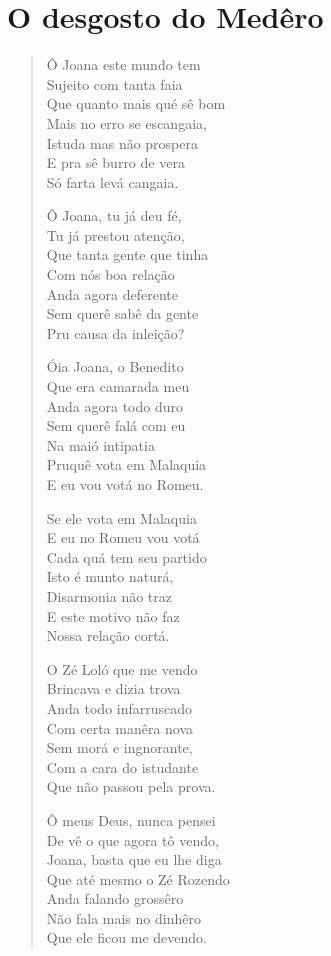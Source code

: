 \chapter{O desgosto do Medêro}

\begin{verse}
Ô Joana este mundo tem\\
Sujeito com tanta faia\\
Que quanto mais qué sê bom\\
Mais no erro se escangaia,\\
Istuda mas não prospera\\
E pra sê burro de vera\\
Só farta levá cangaia.

Ô Joana, tu já deu fé,\\
Tu já prestou atenção,\\
Que tanta gente que tinha\\
Com nós boa relação\\
Anda agora deferente\\
Sem querê sabê da gente\\
Pru causa da inleição?

Óia Joana, o Benedito\\
Que era camarada meu\\
Anda agora todo duro\\
Sem querê falá com eu\\
Na maió intipatia\\
Pruquê vota em Malaquia\\
E eu vou votá no Romeu.

Se ele vota em Malaquia\\
E eu no Romeu vou votá\\
Cada quá tem seu partido\\
Isto é munto naturá,\\
Disarmonia não traz\\
E este motivo não faz\\
Nossa relação cortá.

O Zé Loló que me vendo\\
Brincava e dizia trova\\
Anda todo infarruscado\\
Com certa manêra nova\\
Sem morá e ingnorante,\\
Com a cara do istudante\\
Que não passou pela prova.

Ô meus Deus, nunca pensei\\
De vê o que agora tô vendo,\\
Joana, basta que eu lhe diga\\
Que até mesmo o Zé Rozendo\\
Anda falando grossêro\\
Não fala mais no dinhêro\\
Que ele ficou me devendo.


\end{verse}
